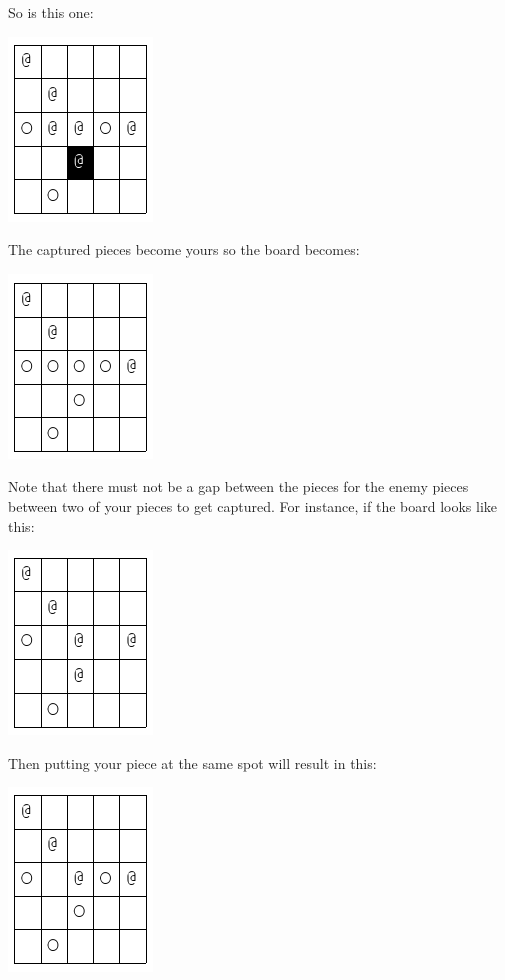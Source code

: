 So is this one:

\includegraphics[scale=0.5]{../a11/a11q04/question/pic4.png}

The captured pieces become yours so the board becomes:

\includegraphics[scale=0.5]{../a11/a11q04/question/pic5.png}

Note that there must not be a gap between the pieces for the enemy pieces
between two of your pieces to get captured. For instance, if the board looks
like this:

\includegraphics[scale=0.5]{../a11/a11q04/question/pic6.png}

Then putting your piece at the same spot will result in this:

\includegraphics[scale=0.5]{../a11/a11q04/question/pic7.png}

